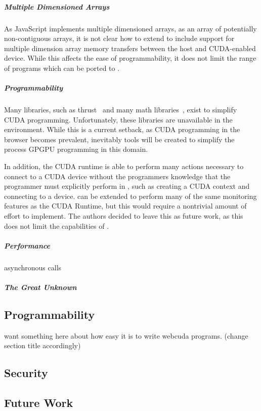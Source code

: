 \subparagraph{Multiple Dimensioned Arrays}
As JavaScript implements multiple dimensioned arrays, as an array of potentially
non-contiguous arrays, it is not clear how to extend \name to include
support for multiple dimension array memory transfers between the host and
CUDA-enabled device. While this affects the ease of programmability, it does not
limit the range of programs which can be ported to \namens.

\subparagraph{Programmability} Many libraries, such as thrust~\cite{thrust} and
many math libraries~\cite{magma, cuSparse, arrayFire}, exist to simplify CUDA
programming. Unfortunately, these libraries are unavailable in the \name environment. While
this is a current setback, as CUDA programming in the browser becomes prevalent,
inevitably tools will be created to simplify the process GPGPU programming in
this domain.

In addition, the CUDA runtime is able to perform many actions necessary to
connect to a CUDA device without the programmers knowledge that the programmer
must explicitly perform in \namens, such as creating a CUDA context and
connecting to a device. \name can be extended to perform many of the same
monitoring features as the CUDA Runtime, but this would require a nontrivial
amount of effort to implement. The authors decided to leave this as future work,
as this does not limit the capabilities of \namens.

\subparagraph{Performance}
asynchronous calls


\subparagraph{The Great Unknown}

\subsection{Programmability}
want something here about how easy it is to write webcuda programs. (change section title accordingly)

\subsection{Security}
\subsection{Future Work}
